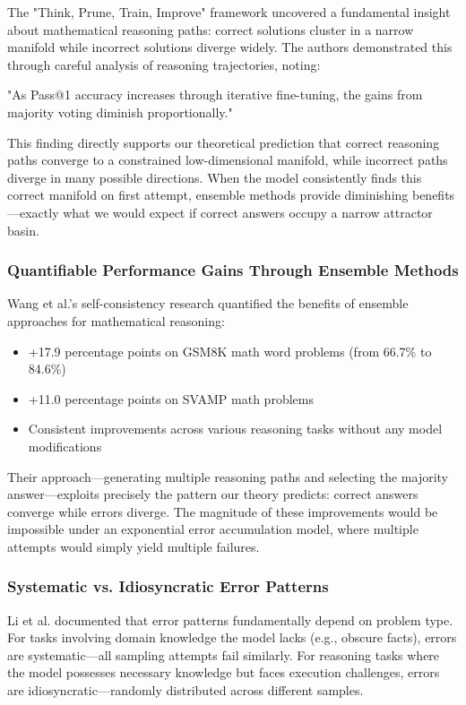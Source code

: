 \documentclass{article}
\begin{document}
The "Think, Prune, Train, Improve" framework \citep{costello2025think} uncovered a fundamental insight about mathematical reasoning paths: correct solutions cluster in a narrow manifold while incorrect solutions diverge widely. The authors demonstrated this through careful analysis of reasoning trajectories, noting:

"As Pass@1 accuracy increases through iterative fine-tuning, the gains from majority voting diminish proportionally." \citep{costello2025think}

This finding directly supports our theoretical prediction that correct reasoning paths converge to a constrained low-dimensional manifold, while incorrect paths diverge in many possible directions. When the model consistently finds this correct manifold on first attempt, ensemble methods provide diminishing benefits—exactly what we would expect if correct answers occupy a narrow attractor basin.

\subsubsection{Quantifiable Performance Gains Through Ensemble Methods}

Wang et al.'s \citep{wang2023self} self-consistency research quantified the benefits of ensemble approaches for mathematical reasoning:

\begin{itemize}
\item +17.9 percentage points on GSM8K math word problems (from 66.7\% to 84.6\%)
\item +11.0 percentage points on SVAMP math problems
\item Consistent improvements across various reasoning tasks without any model modifications
\end{itemize}

Their approach—generating multiple reasoning paths and selecting the majority answer—exploits precisely the pattern our theory predicts: correct answers converge while errors diverge. The magnitude of these improvements would be impossible under an exponential error accumulation model, where multiple attempts would simply yield multiple failures.

\subsubsection{Systematic vs. Idiosyncratic Error Patterns}

Li et al. \citep{li2023reliability} documented that error patterns fundamentally depend on problem type. For tasks involving domain knowledge the model lacks (e.g., obscure facts), errors are systematic—all sampling attempts fail similarly. For reasoning tasks where the model possesses necessary knowledge but faces execution challenges, errors are idiosyncratic—randomly distributed across different samples.
\end{document}
